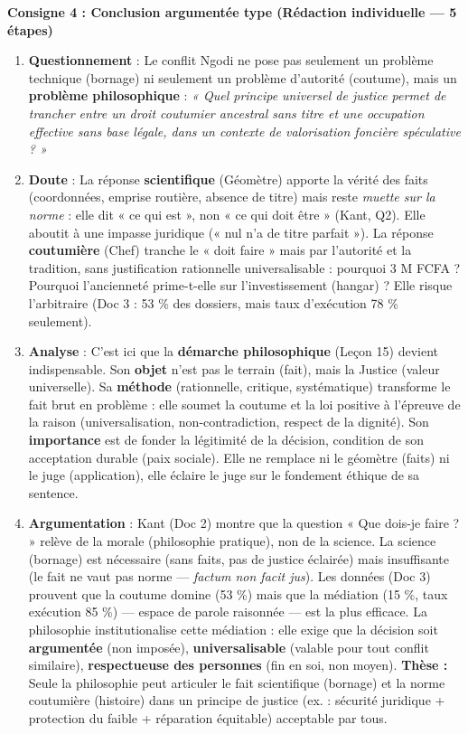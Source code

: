 \documentclass[11pt]{article}
\newcommand{\cle}[1]{{\popxbold\color{popdark}#1}}
\begin{document}
\begin{exoresolu}
\textbf{Consigne 4 : Conclusion argumentée type (Rédaction individuelle — 5 étapes)}

\begin{enumerate}
    \item \textbf{Questionnement} : Le conflit Ngodi ne pose pas seulement un problème technique (bornage) ni seulement un problème d'autorité (coutume), mais un \textbf{problème philosophique} : \emph{« Quel principe universel de justice permet de trancher entre un droit coutumier ancestral sans titre et une occupation effective sans base légale, dans un contexte de valorisation foncière spéculative ? »}
    \item \textbf{Doute} : La réponse \textbf{scientifique} (Géomètre) apporte la \cle{vérité des faits} (coordonnées, emprise routière, absence de titre) mais reste \emph{muette sur la norme} : elle dit « ce qui est », non « ce qui doit être » (Kant, Q2). Elle aboutit à une impasse juridique (« nul n'a de titre parfait »). La réponse \textbf{coutumière} (Chef) tranche le « doit faire » mais par \cle{l'autorité} et la \cle{tradition}, sans \cle{justification rationnelle universalisable} : pourquoi 3 M FCFA ? Pourquoi l'ancienneté prime-t-elle sur l'investissement (hangar) ? Elle risque l'arbitraire (Doc 3 : 53 \% des dossiers, mais taux d'exécution 78 \% seulement).
    \item \textbf{Analyse} : C'est ici que la \textbf{démarche philosophique} (Leçon 15) devient \cle{indispensable}. Son \textbf{objet} n'est pas le terrain (fait), mais la \cle{Justice} (valeur universelle). Sa \textbf{méthode} (rationnelle, critique, systématique) transforme le fait brut en \cle{problème} : elle soumet la coutume et la loi positive à l'épreuve de la \cle{raison} (universalisation, non-contradiction, respect de la dignité). Son \textbf{importance} est de fonder la \cle{légitimité} de la décision, condition de son acceptation durable (paix sociale). Elle ne remplace ni le géomètre (faits) ni le juge (application), elle \cle{éclaire} le juge sur le \cle{fondement éthique} de sa sentence.
    \item \textbf{Argumentation} : Kant (Doc 2) montre que la question « Que dois-je faire ? » relève de la \cle{morale} (philosophie pratique), non de la science. La science (bornage) est \cle{nécessaire} (sans faits, pas de justice éclairée) mais \cle{insuffisante} (le fait ne vaut pas norme — \emph{factum non facit jus}). Les données (Doc 3) prouvent que la coutume domine (53 \%) mais que la médiation (15 \%, taux exécution 85 \%) — espace de \cle{parole raisonnée} — est la plus efficace. La philosophie \cle{institutionalise} cette médiation : elle exige que la décision soit \textbf{argumentée} (non imposée), \textbf{universalisable} (valable pour tout conflit similaire), \textbf{respectueuse des personnes} (fin en soi, non moyen). \textbf{Thèse :} Seule la philosophie peut articuler le fait scientifique (bornage) et la norme coutumière (histoire) dans un \cle{principe de justice} (ex. : sécurité juridique + protection du faible + réparation équitable) acceptable par tous.

\end{enumerate}
\end{exoresolu}
\end{document}

